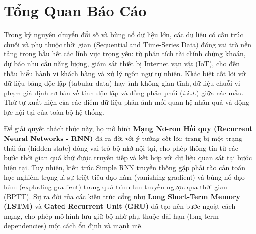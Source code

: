 \documentclass[12pt,a4paper]{report}
\begin{document}
\tableofcontents
\newpage
\listoffigures
\listoftables
\lstlistoflistings
\newpage
{}

\chapter*{Tổng Quan Báo Cáo}

Trong kỷ nguyên chuyển đổi số và bùng nổ dữ liệu lớn, các dữ liệu có cấu trúc chuỗi và phụ thuộc thời gian (Sequential and Time-Series Data) đóng vai trò nền tảng trong hầu hết các lĩnh vực trọng yếu: từ phân tích tài chính chứng khoán, dự báo nhu cầu năng lượng, giám sát thiết bị Internet vạn vật (IoT), cho đến thấu hiểu hành vi khách hàng và xử lý ngôn ngữ tự nhiên. Khác biệt cốt lõi với dữ liệu bảng độc lập (tabular data) hay ảnh không gian tĩnh, dữ liệu chuỗi vi phạm giả định cơ bản về tính độc lập và đồng phân phối ($i.i.d.$) giữa các mẫu. Thứ tự xuất hiện của các điểm dữ liệu phản ánh mối quan hệ nhân quả và động lực nội tại của toàn bộ hệ thống.

Để giải quyết thách thức này, họ mô hình \textbf{Mạng Nơ-ron Hồi quy (Recurrent Neural Networks - RNN)} đã ra đời với ý tưởng cốt lõi: trang bị một trạng thái ẩn (hidden state) đóng vai trò bộ nhớ nội tại, cho phép thông tin từ các bước thời gian quá khứ được truyền tiếp và kết hợp với dữ liệu quan sát tại bước hiện tại. Tuy nhiên, kiến trúc Simple RNN truyền thống gặp phải rào cản toán học nghiêm trọng là sự triệt tiêu đạo hàm (vanishing gradient) và bùng nổ đạo hàm (exploding gradient) trong quá trình lan truyền ngược qua thời gian (BPTT). Sự ra đời của các kiến trúc cổng như \textbf{Long Short-Term Memory (LSTM)} và \textbf{Gated Recurrent Unit (GRU)} đã tạo nên bước ngoặt cách mạng, cho phép mô hình lưu giữ bộ nhớ phụ thuộc dài hạn (long-term dependencies) một cách ổn định và mạnh mẽ.
\end{document}

